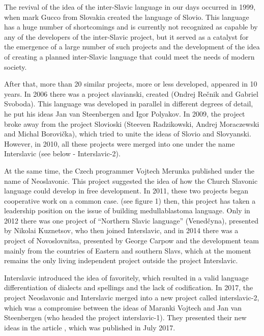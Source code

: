 The revival of the idea of the inter-Slavic language in our days occurred in 1999, when mark Gucco from Slovakia created the language of Slovio. This language has a huge number of shortcomings and is currently not recognized as capable by any of the developers of the inter-Slavic project, but it served as a catalyst for the emergence of a large number of such projects and the development of the idea of creating a planned inter-Slavic language that could meet the needs of modern society. 

After that, more than 20 similar projects, more or less developed, appeared in 10 years. In 2006 there was a project slavianski, created (Ondrej Rečnik and Gabriel Svoboda). This language was developed in parallel in different degrees of detail, he put his ideas Jan van Steenbergen and Igor Polyakov. In 2009, the project broke away from the project Slovioski (Steeven Radzikowski, Andrej Moraczewski and Michal Borovička), which tried to unite the ideas of Slovio and Slovyanski. However, in 2010, all these projects were merged into one under the name Interslavic (see below - Interslavic-2).

At the same time, the Czech programmer Vojtech Merunka published under the name of Neoslavonic. This project suggested the idea of how the Church Slavonic language could develop in free development. In 2011, these two projects began cooperative work on a common case. (see figure 1) then, this project has taken a leadership position on the issue of building medullablastoma language. Only in 2012 there was one project of “Northern Slavic language” (Venedčyna), presented by Nikolai Kuznetsov, who then joined Interslavic, and in 2014 there was a project of Novoslovnitsa, presented by George Carpow and the development team mainly from the countries of Eastern and southern Slavs, which at the moment remains the only living independent project outside the project Interslavic.

Interslavic introduced the idea of favoritely, which resulted in a valid language differentiation of dialects and spellings and the lack of codification.  In 2017, the project Neoslavonic and Interslavic merged into a new project called interslavic-2, which was a compromise between the ideas of Maranki Vojtech and Jan van Steenbergen (who headed the project interslavic-1). They presented their new ideas in the article \cite{interslavic-2}, which was published in July 2017.
